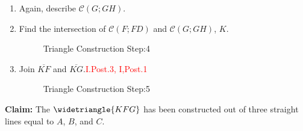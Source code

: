 \documentclass{book}
\begin{document}
\begin{enumerate}
\item Again, describe $\mathscr{C}(G;GH)$. 

\item Find the intersection of $\mathscr{C}(F;FD)$ and $\mathscr{C}(G;GH)$,  $K$. 

\begin{figure}[H]
\centering
	\caption{Triangle Construction Step:4}
\end{figure}

\clearpage

\item Join $\overline{KF}$ and $\overline{KG}$.\hfill\textcolor{red}{I.Post.3, I,Post.1}

\begin{figure}[H]
\centering
	\caption{Triangle Construction Step:5}
\end{figure}

\end{enumerate}

\textbf{Claim:} The $\widetriangle{KFG}$ has been constructed out of three straight lines equal to $A$, $B$, and $C$.
\end{document}

